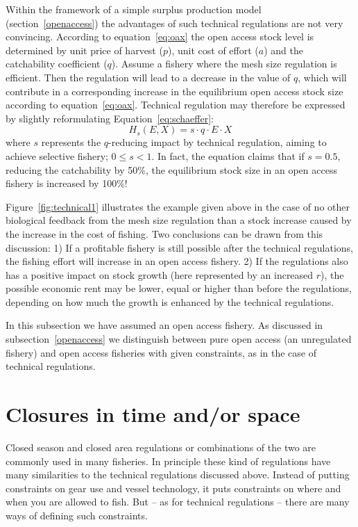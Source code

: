 \documentclass[11pt,fleqn]{book} %
\begin{document}
Within the framework of a simple surplus production model (section~\ref{openaccess}) the advantages of such technical regulations are not very convincing. According to equation~\ref{eq:oax} the open access stock level is determined by unit price of harvest ($p$), unit cost of effort ($a$) and the catchability coefficient ($q$). Assume a fishery where the mesh size regulation is efficient. Then the regulation will lead to a decrease in the value of $q$, which will contribute in a corresponding increase in the equilibrium open access stock size according to equation~\ref{eq:oax}. Technical regulation may therefore be expressed by slightly reformulating Equation~\ref{eq:schaeffer}:
\begin{equation} 
\label{eq:selection}
  H_s(E, X) = s \cdot q \cdot E \cdot X
\end{equation}
where $s$ represents the $q$-reducing impact by technical regulation, aiming to achieve selective fishery; $0 \leq s < 1$. In fact, the equation claims that if $s = 0.5$, reducing the catchability by 50\%, the equilibrium stock size in an open access fishery is increased by 100\%!

Figure~\ref{fig:technical1} illustrates the example given above in the case of no other biological feedback from the mesh size regulation than a stock increase caused by the increase in the cost of fishing. Two conclusions can be drawn from this discussion: 1) If a profitable fishery is still possible after the technical regulations, the fishing effort will increase in an open access fishery. 2) If the regulations also has a positive impact on stock growth (here represented by an increased $r$), the possible economic rent may be lower, equal or higher than before the regulations, depending on how much the growth is enhanced by the technical regulations.

In this subsection we have assumed an open access fishery. As discussed in subsection~\ref{openaccess} we distinguish between pure open access (an unregulated fishery) and open access fisheries with given constraints, as in the case of technical regulations.

\section{Closures in time and/or space} \label{MPA}

Closed season and closed area regulations or combinations of the two are commonly used in many fisheries. In principle these kind of regulations have many similarities to the technical regulations discussed above. Instead of putting constraints on gear use and vessel technology, it puts constraints on where and when you are allowed to fish. But -- as for technical regulations -- there are many ways of defining such constraints.
\end{document}
